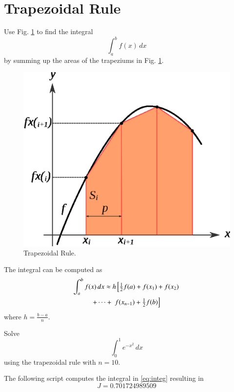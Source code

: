 \documentclass[journal,12pt,twocolumn]{IEEEtran}
\begin{document}
\section{Trapezoidal Rule}
\begin{problem}
Use Fig. \ref{fig:trapezoid_wiki} to find the integral
\begin{equation}
\int_{a}^{b}f(x)\,dx 
\end{equation}
%
by summing up the areas of the trapeziums in Fig. \ref{fig:trapezoid_wiki}.
\end{problem}
%
\begin{figure}[!h]
\centering
\includegraphics[width=\columnwidth]{./figs/trapezoid_wiki.eps}
\caption{Trapezoidal Rule.}
\label{fig:trapezoid_wiki}
\end{figure}
\solution  The integral can be computed as \cite{trapezoid}
%
\begin{multline}
\int_{a}^{b}f(x)\,dx \approx h {}\left[\tfrac{1}{2}f(a)+f(x_1)+f(x_2)\right.
\\
+\dots + {}\left.f(x_{n-1})+\tfrac{1}{2}f(b)\right]
\end{multline}
%
where $h = \frac{b-a}{n}$.
\begin{problem}
Solve 
\begin{equation}
\label{eq:integ}
\int_{0}^{1}e^{-x^2}\,dx
\end{equation}
using the trapezoidal rule with $n =10$.
\end{problem}
\solution The following script computes the integral in \eqref{eq:integ} resulting in
\begin{equation}
J = 0.701724989509
\end{equation}

\end{document}
